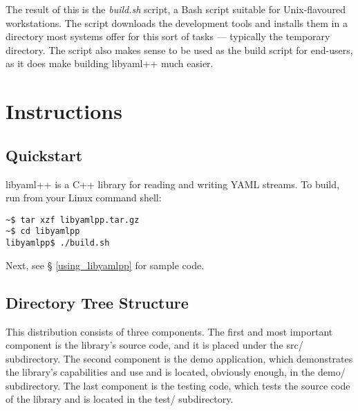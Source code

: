 \documentclass{article}
\begin{document}
The result of this is the \textit{build.sh} script, a Bash script suitable for 
Unix-flavoured workstations.  The script downloads the development tools and 
installs them in a directory most systems offer for this sort of tasks --- 
typically the temporary directory.  The script also makes sense to be used as 
the build script for end-users, as it does make building libyaml++ much easier.




%
%

\section{Instructions}

\subsection{Quickstart}

libyaml++ is a C++ library for reading and writing YAML streams.  To build,
run from your Linux command shell:

\begin{verbatim}
~$ tar xzf libyamlpp.tar.gz
~$ cd libyamlpp
libyamlpp$ ./build.sh
\end{verbatim}

Next, see \S{} \ref{using_libyamlpp} for sample code.

\subsection{Directory Tree Structure}

This distribution consists of three components.  The first and most important
component is the library's source code, and it is placed under the src/
subdirectory.  The second component is the demo application, which demonstrates
the library's capabilities and use and is located, obviously enough, in the
demo/ subdirectory.  The last component is the testing code, which tests the
source code of the library and is located in the test/ subdirectory.
\end{document}
